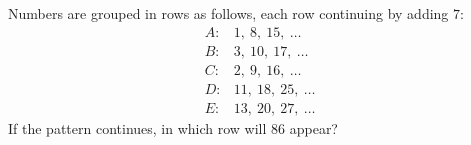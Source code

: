 Numbers are grouped in rows as follows, each row continuing by adding $7$:
\[
\begin{array}{ll}
A: & 1,\ 8,\ 15,\ \dots\\
B: & 3,\ 10,\ 17,\ \dots\\
C: & 2,\ 9,\ 16,\ \dots\\
D: & 11,\ 18,\ 25,\ \dots\\
E: & 13,\ 20,\ 27,\ \dots
\end{array}
\]
If the pattern continues, in which row will $86$ appear?
